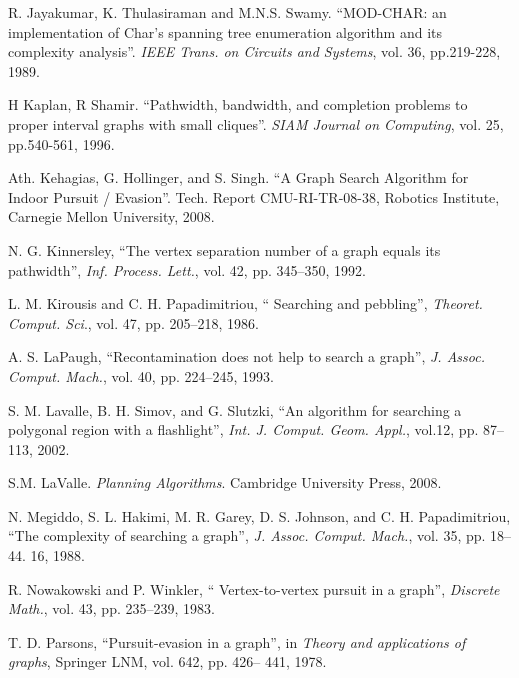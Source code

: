 \documentclass[11pt]{article}\usepackage{amsmath}
\begin{document}
\begin{thebibliography}{99}
R. Jayakumar, K. Thulasiraman and M.N.S. Swamy.
\textquotedblleft MOD-CHAR: an implementation of Char's spanning tree
enumeration algorithm and its complexity analysis\textquotedblright.
\emph{IEEE Trans. on Circuits and Systems}, vol. 36, pp.219-228, 1989.

H Kaplan, R Shamir. \textquotedblleft Pathwidth,
bandwidth, and completion problems to proper interval graphs with small
cliques\textquotedblright. \emph{SIAM Journal on Computing}, vol. 25,
pp.540-561, 1996.

Ath. Kehagias, G. Hollinger, and S. Singh.
\textquotedblleft A Graph Search Algorithm for Indoor Pursuit /
Evasion\textquotedblright. Tech. Report CMU-RI-TR-08-38, Robotics Institute,
Carnegie Mellon University, 2008.

N. G. Kinnersley, \textquotedblleft The vertex separation
number of a graph equals its pathwidth\textquotedblright, \emph{Inf. Process.
Lett.}, vol. 42, pp. 345--350, 1992.

L. M. Kirousis and C. H. Papadimitriou, \textquotedblleft
Searching and pebbling\textquotedblright, \emph{Theoret. Comput. Sci}., vol.
47, pp. 205--218, 1986.

A. S. LaPaugh, \textquotedblleft Recontamination does not
help to search a graph\textquotedblright, \emph{J. Assoc. Comput. Mach.}, vol.
40, pp. 224--245, 1993.

S. M. Lavalle, B. H. Simov, and G. Slutzki,
\textquotedblleft An algorithm for searching a polygonal region with a
flashlight\textquotedblright, \emph{Int. J. Comput. Geom. Appl.}, vol.12, pp.
87--113, 2002.

S.M. LaValle. \emph{Planning Algorithms}. Cambridge
University Press, 2008.

N. Megiddo, S. L. Hakimi, M. R. Garey, D. S. Johnson, and C.
H. Papadimitriou, \textquotedblleft The complexity of searching a
graph\textquotedblright, \emph{J. Assoc. Comput. Mach.}, vol. 35, pp. 18--44.
16, 1988.

R. Nowakowski and P. Winkler, \textquotedblleft
Vertex-to-vertex pursuit in a graph\textquotedblright, \emph{Discrete Math.},
vol. 43, pp. 235--239, 1983.

T. D. Parsons, \textquotedblleft Pursuit-evasion in a
graph\textquotedblright, in \emph{Theory and applications of graphs}, Springer
LNM, vol. 642, pp. 426-- 441, 1978.


\end{thebibliography}
\end{document}
